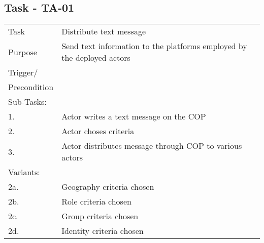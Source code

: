 

\subsection{Task - TA-01}

\begin{longtable}{| p{2.5cm}  | p{10cm} |  }
	\hline
	Task & Distribute text message \\
	Purpose & Send text information to the platforms employed by the  deployed actors \\
	Trigger/ &  \\ Precondition &  \\
	\hline
	Sub-Tasks: & \\
	1. & Actor writes a text message on the COP \\
	2. & Actor choses criteria \\
	3. & Actor distributes message through COP to various actors \\
	\hline
	Variants: & \\
	2a. & Geography criteria chosen \\
	2b. & Role criteria chosen\\
	2c. & Group criteria chosen\\
	2d. & Identity criteria chosen\\
	\hline
\end{longtable}

\FloatBarrier
\newpage

